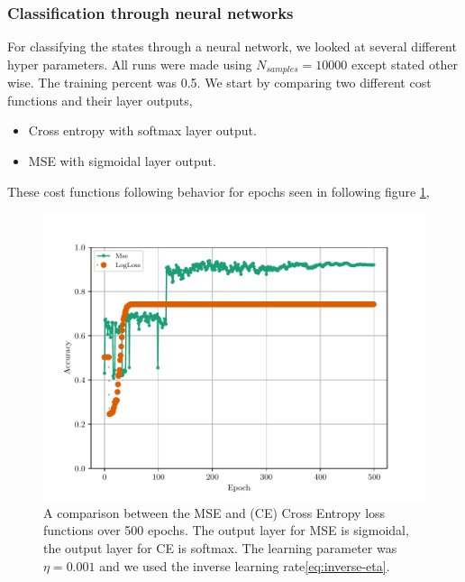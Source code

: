 \subsubsection{Classification through neural networks}
For classifying the states through a neural network, we looked at several different hyper parameters. All runs were made using $N_{samples}=10000$ except stated other wise. The training percent was 0.5. We start by comparing two different cost functions and their layer outputs,
\begin{itemize}
    \item Cross entropy with softmax layer output.
    \item MSE with sigmoidal layer output.
\end{itemize}
These cost functions following behavior for epochs seen in following figure \ref{fig:mlp-cost-function-comparison},
\begin{figure}[H]
    \centering
    \includegraphics[scale=1.0]{../fig/mlp_epoch_cost_functions.pdf}
    \caption{A comparison between the MSE and (CE) Cross Entropy loss functions over 500 epochs. The output layer for MSE is sigmoidal, the output layer for CE is softmax. The learning parameter was $\eta=0.001$ and we used the inverse learning rate\eqref{eq:inverse-eta}.}
    \label{fig:mlp-cost-function-comparison}
\end{figure}

